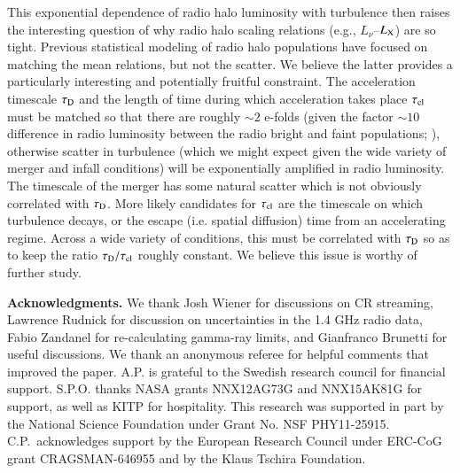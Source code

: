 \documentclass[fleqn,usenatbib,useAMS]{mnras}
\begin{document}
This exponential dependence of radio halo luminosity with turbulence then raises
the interesting question of why radio halo scaling relations (e.g.,
$L_{\nu}$--$L_{\rm X}$) are so tight. Previous statistical modeling of radio
halo populations \citep{2006MNRAS.369.1577C,2007MNRAS.378.1565C} have focused
on matching the mean relations, but not the scatter. We believe the latter
provides a particularly interesting and potentially fruitful constraint. The
acceleration timescale $\tau_{\rm D}$ and the length of time during which
acceleration takes place $\tau_{\rm cl}$ must be matched so that there are
roughly $\sim 2$ e-folds (given the factor $\sim 10$ difference in radio
luminosity between the radio bright and faint populations; \citet{brown11}),
otherwise scatter in turbulence (which we might expect given the wide variety of
merger and infall conditions) will be exponentially amplified in radio
luminosity. The timescale of the merger has some natural scatter which is not
obviously correlated with $\tau_{\rm D}$. More likely candidates for $\tau_{\rm
  cl}$ are the timescale on which turbulence decays, or the escape (i.e. spatial
diffusion) time from an accelerating regime. Across a wide variety of
conditions, this must be correlated with $\tau_{\rm D}$ so as to keep the ratio
$\tau_{\rm D}/\tau_{\rm cl}$ roughly constant. We believe this issue is worthy
of further study.


{\bf Acknowledgments.} We thank Josh Wiener for discussions on CR streaming,
Lawrence Rudnick for discussion on uncertainties in the 1.4 GHz radio data,
Fabio Zandanel for re-calculating gamma-ray limits, and Gianfranco Brunetti for
useful discussions. We thank an anonymous referee for helpful comments that
improved the paper. A.P. is grateful to the Swedish research council for
financial support. S.P.O. thanks NASA grants NNX12AG73G and NNX15AK81G for
support, as well as KITP for hospitality. This research was supported in part by
the National Science Foundation under Grant No. NSF
PHY11-25915. C.P.~acknowledges support by the European Research Council under
ERC-CoG grant CRAGSMAN-646955 and by the Klaus Tschira Foundation.


\vspace{-0.7cm}



\end{document}
